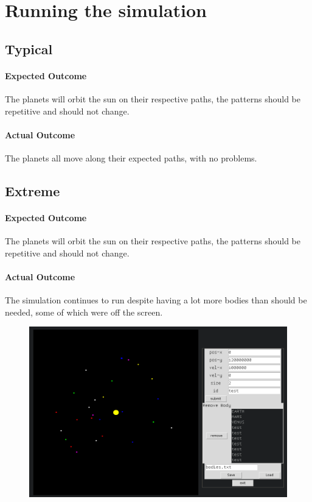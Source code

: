 \section{Running the simulation}
\subsection{Typical}
\paragraph{Expected Outcome}
The planets will orbit the sun on their respective paths, the patterns should be
repetitive and should not change.
\paragraph{Actual Outcome}
The planets all move along their expected paths, with no problems.

\subsection{Extreme}
\paragraph{Expected Outcome}
The planets will orbit the sun on their respective paths, the patterns should be
repetitive and should not change.
\paragraph{Actual Outcome}
The simulation continues to run despite having a lot more bodies than should be
needed, some of which were off the screen.
\begin{figure}[H]
	\includegraphics[width=\textwidth]{./img/run.png}
\end{figure}


